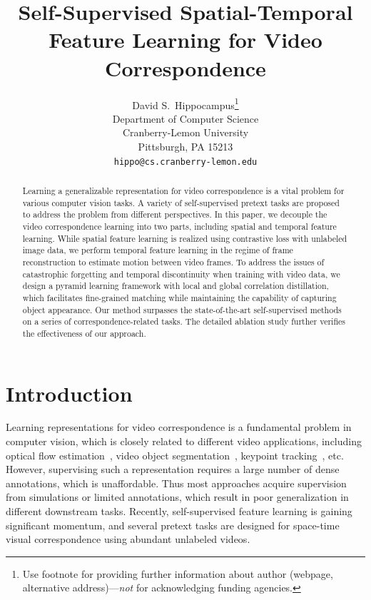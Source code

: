 \documentclass{article}
\title{Self-Supervised Spatial-Temporal Feature Learning for Video Correspondence}
\author{%
  David S.~Hippocampus\thanks{Use footnote for providing further information
    about author (webpage, alternative address)---\emph{not} for acknowledging
    funding agencies.} \\
  Department of Computer Science\\
  Cranberry-Lemon University\\
  Pittsburgh, PA 15213 \\
  \texttt{hippo@cs.cranberry-lemon.edu} \\
}
\begin{document}
\maketitle


\begin{abstract}
  Learning a generalizable representation for video correspondence is a vital problem for various computer vision tasks. A variety of self-supervised pretext tasks are proposed to address the problem from different perspectives. In this paper, we decouple the video correspondence learning into two parts, including spatial and temporal feature learning. While spatial feature learning is realized using contrastive loss with unlabeled image data, we perform temporal feature learning in the regime of frame reconstruction to estimate motion between video frames. To address the issues of catastrophic forgetting and temporal discontinuity when training with video data, we design a pyramid learning framework with local and global correlation distillation, which facilitates fine-grained matching while maintaining the capability of capturing object appearance. Our method surpasses the state-of-the-art self-supervised methods on a series of correspondence-related tasks. The detailed ablation study further verifies the effectiveness of our approach.
\end{abstract}



\section{Introduction}
Learning representations for video correspondence is a fundamental problem in computer vision, which is closely related to different video applications, including optical flow estimation~\cite{dosovitskiy2015flownet}\cite{horn1981determining}, video object segmentation~\cite{caelles2017one}\cite{oh2019video}, keypoint tracking~\cite{xiu2018pose}, etc. However, supervising such a representation requires a large number of dense annotations, which is unaffordable. Thus most approaches acquire supervision from simulations or limited annotations, which result in poor generalization in different downstream tasks. Recently, self-supervised feature learning is gaining significant momentum, and several pretext tasks are designed for space-time visual correspondence using abundant unlabeled videos. 
\end{document}
